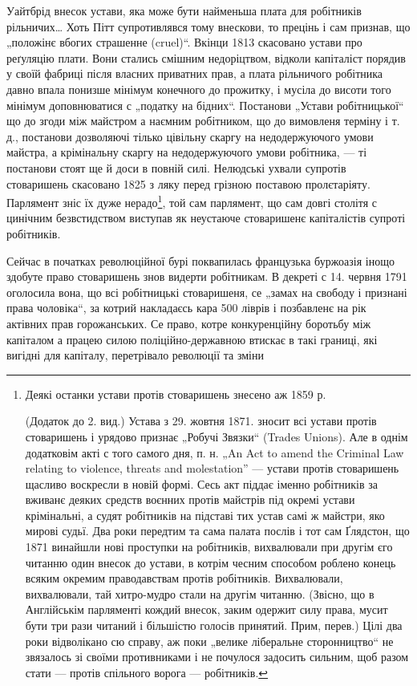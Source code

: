 \parcont{}
Уайтбрід внесок устави, яка може бути найменьша плата
для робітників рільничих\dots{} Хоть Пітт супротивлявся тому
внескови, то прецінь і сам признав, що „положінє вбогих
страшенне (cruel)“. Вкінци 1813 скасовано устави про реґуляцію
плати. Вони стались смішним недоріцтвом, відколи
капіталіст порядив у своїй фабриці після власних приватних
прав, а плата рільничого робітника давно впала понизше
мінімум конечного до прожитку, і мусіла до висоти
того мінімум доповнюватися с „податку на бідних“. Постанови
„Устави робітницької“ що до згоди між майстром
а наємним робітником, що до вимовленя терміну і т. д.,
постанови дозволяючі тілько цівільну скаргу на недодержуючого
умови майстра, а крімінальну скаргу на недодержуючого
умови робітника, — ті постанови стоят ще й доси
в повній силі. Нелюдські ухвали супротів стоваришень
скасовано 1825 з ляку перед грізною поставою пролєтаріяту.
Парлямент зніс їх дуже нерадо\footnote{
Деякі останки устави протів стоваришень знесено аж 1859 р.

(Додаток до 2. вид.) Устава з 29. жовтня 1871. зносит всі устави
протів стоваришень і урядово признає „Робучі Звязки“ (Trades Unions).
Але в однім додатковім акті с того самого дня, п. н. „An Act to amend
the Criminal Law relating to violence, threats and molestation” — устави
протів стоваришень щасливо воскресли в новій формі. Сесь акт піддає
іменно робітників за вживанє деяких средств воєнних протів майстрів
під окремі устави крімінальні, а судят робітників на підставі тих устав
самі ж майстри, яко мирові судьї. Два роки передтим та сама палата
послів і тот сам Ґлядстон, що 1871 винайшли нові проступки на робітників,
вихвалювали при другім єго читанню один внесок до устави, в котрім
чесним способом роблено конець всяким окремим праводавствам
протів робітників. Вихвалювали, вихвалювали, тай хитро-мудро стали на
другім читанню. (Звісно, що в Англійськім парляменті кождий внесок,
заким одержит силу права, мусит бути три рази читаний і більшістю голосів
принятий. Прим, перев.) Цілі два роки відволікано сю справу, аж
поки „велике ліберальне сторонництво“ не звязалось зі своїми противниками
і не почулося задосить сильним, щоб разом стати — протів спільного
ворога — робітників.
},  той сам парлямент, що
сам довгі столітя с цинічним безвстидством виступав як
неустаюче стоваришенє капіталістів супроті робітників.

Сейчас в початках революційної бурі поквапилась французька
буржоазія інощо здобуте право стоваришень знов
видерти робітникам. В декреті с 14. червня 1791 оголосила
вона, що всі робітницькі стоваришеня, се „замах на свободу
і признані права чоловіка“, за котрий накладаєсь кара
500 ліврів і позбавленє на рік актівних прав горожанських.
Се право, котре конкуренційну боротьбу між капіталом
а працею силою поліційно-державною втискає в такі границі,
які вигідні для капіталу, перетрівало революції та зміни
\parbreak{}
